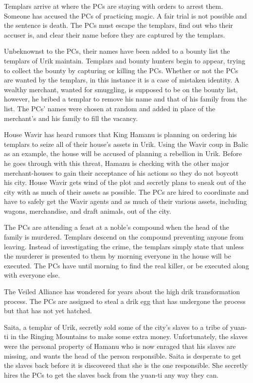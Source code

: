 {
	\item Templars arrive at where the PCs are staying with orders to arrest them. Someone has accused the PCs of practicing magic. A fair trial is not possible and the sentence is death. The PCs must escape the templars, find out who their accuser is, and clear their name before they are captured by the templars.
	\item Unbeknownst to the PCs, their names have been added to a bounty list the templars of Urik maintain. Templars and bounty hunters begin to appear, trying to collect the bounty by capturing or killing the PCs. Whether or not the PCs are wanted by the templars, in this instance it is a case of mistaken identity. A wealthy merchant, wanted for smuggling, is supposed to be on the bounty list, however, he bribed a templar to remove his name and that of his family from the list. The PCs' names were chosen at random and added in place of the merchant's and his family to fill the vacancy.
	\item House Wavir has heard rumors that King Hamanu is planning on ordering his templars to seize all of their house's assets in Urik. Using the Wavir coup in Balic as an example, the house will be accused of planning a rebellion in Urik. Before he goes through with this threat, Hamanu is checking with the other major merchant-houses to gain their acceptance of his actions so they do not boycott his city. House Wavir gets wind of the plot and secretly plans to sneak out of the city with as much of their assets as possible. The PCs are hired to coordinate and have to safely get the Wavir agents and as much of their various assets, including wagons, merchandise, and draft animals, out of the city.
	\item The PCs are attending a feast at a noble's compound when the head of the family is murdered. Templars descend on the compound preventing anyone from leaving. Instead of investigating the crime, the templars simply state that unless the murderer is presented to them by morning everyone in the house will be executed. The PCs have until morning to find the real killer, or be executed along with everyone else.
	\item The Veiled Alliance has wondered for years about the high drik transformation process. The PCs are assigned to steal a drik egg that has undergone the process but that has not yet hatched.
	\item Saita, a templar of Urik, secretly sold some of the city's slaves to a tribe of yuan-ti in the Ringing Mountains to make some extra money. Unfortunately, the slaves were the personal property of Hamanu who is now enraged that his slaves are missing, and wants the head of the person responsible. Saita is desperate to get the slaves back before it is discovered that she is the one responsible. She secretly hires the PCs to get the slaves back from the yuan-ti any way they can.
}